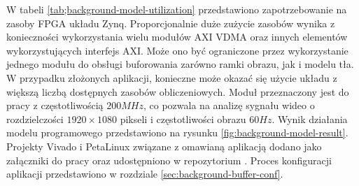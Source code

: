W tabeli \ref{tab;background-model-utilization} przedstawiono zapotrzebowanie na zasoby FPGA układu Zynq.
Proporcjonalnie duże zużycie zasobów wynika z konieczności wykorzystania wielu modułów AXI VDMA oraz innych elementów wykorzystujących interfejs AXI. 
Może ono być ograniczone przez wykorzystanie jednego modułu do obsługi buforowania zarówno ramki obrazu, jak i modelu tła. 
W przypadku złożonych aplikacji, konieczne może okazać się użycie układu z większą liczbą dostępnych zasobów obliczeniowych. 
Moduł przeznaczony jest do pracy z częstotliwością $200MHz$, co pozwala na analizę sygnału wideo o rozdzielczości $1920 \times 1080$ pikseli i częstotliwości obrazu $60Hz$.
Wynik działania modelu programowego przedstawiono na rysunku \ref{fig:background-model-result}. Projekty Vivado i PetaLinux związane z omawianą aplikacją dodano jako załączniki do pracy oraz udostępniono w repozytorium \cite{git-repository}. Proces konfiguracji aplikacji przedstawiono w rozdziale \ref{sec:background-buffer-conf}.
